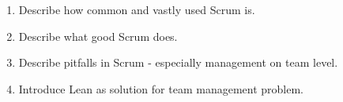 \begin{enumerate}
	\item Describe how common and vastly used Scrum is.
	\item Describe what good Scrum does.
	\item Describe pitfalls in Scrum - especially management on team level.
	\item Introduce Lean as solution for team management problem.
\end{enumerate}

